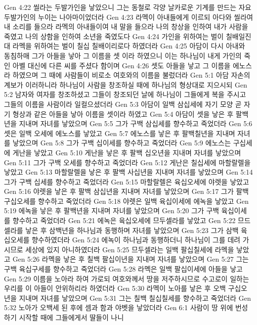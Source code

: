 Gen 4:22  씰라는 두발가인을 낳았으니 그는 동철로 각양 날카로운 기계를 만드는 자요 두발가인의 누이는 나아마이었더라
Gen 4:23  라멕이 아내들에게 이르되 아다와 씰라여 내 소리를 들으라 라멕의 아내들이여 내 말을 들으라 나의 창상을 인하여 내가 사람을 죽였고 나의 상함을 인하여 소년을 죽였도다
Gen 4:24  가인을 위하여는 벌이 칠배일진대 라멕을 위하여는 벌이 칠십 칠배이리로다 하였더라
Gen 4:25  아담이 다시 아내와 동침하매 그가 아들을 낳아 그 이름을 셋 이라 하였으니 이는 하나님이 내게 가인의 죽인 아벨 대신에 다른 씨를 주셨다 함이며
Gen 4:26  셋도 아들을 낳고 그 이름을 에노스라 하였으며 그 때에 사람들이 비로소 여호와의 이름을 불렀더라
Gen 5:1  아담 자손의 계보가 이러하니라 하나님이 사람을 창조하실 때에 하나님의 형상대로 지으시되
Gen 5:2  남자와 여자를 창조하셨고 그들이 창조되던 날에 하나님이 그들에게 복을 주시고 그들의 이름을 사람이라 일컬으셨더라
Gen 5:3  아담이 일백 삼십세에 자기 모양 곧 자기 형상과 같은 아들을 낳아 이름을 셋이라 하였고
Gen 5:4  아담이 셋을 낳은 후 팔백년을 지내며 자녀를 낳았으며
Gen 5:5  그가 구백 삼십세를 향수하고 죽었더라
Gen 5:6  셋은 일백 오세에 에노스를 낳았고
Gen 5:7  에노스를 낳은 후 팔백칠년을 지내며 자녀를 낳았으며
Gen 5:8  그가 구백 십이세를 향수하고 죽었더라
Gen 5:9  에노스는 구십세에 게난을 낳았고
Gen 5:10  게난을 낳은 후 팔백 십오년을 지내며 자녀를 낳았으며
Gen 5:11  그가 구백 오세를 향수하고 죽었더라
Gen 5:12  게난은 칠십세에 마할랄렐을 낳았고
Gen 5:13  마할랄렐을 낳은 후 팔백 사십년을 지내며 자녀를 낳았으며
Gen 5:14  그가 구백 십세를 향수하고 죽었더라
Gen 5:15  마할랄렐은 육십오세에 야렛을 낳았고
Gen 5:16  야렛을 낳은 후 팔백 삼십년을 지내며 자녀를 낳았으며
Gen 5:17  그가 팔백 구십오세를 향수하고 죽었더라
Gen 5:18  야렛은 일백 육십이세에 에녹을 낳았고
Gen 5:19  에녹을 낳은 후 팔백년을 지내며 자녀를 낳았으며
Gen 5:20  그가 구백 육십이세를 향수하고 죽었더라
Gen 5:21  에녹은 육십오세에 므두셀라를 낳았고
Gen 5:22  므드셀라를 낳은 후 삼백년을 하나님과 동행하며 자녀를 낳았으며
Gen 5:23  그가 삼백 육십오세를 향수하였더라
Gen 5:24  에녹이 하나님과 동행하더니 하나님이 그를 데려 가시므로 세상에 있지 아니하였더라
Gen 5:25  므두셀라는 일백 팔십칠세에 라멕을 낳았고
Gen 5:26  라멕을 낳은 후 칠백 팔십이년을 지내며 자녀를 낳았으며
Gen 5:27  그는 구백 육십구세를 향수하고 죽었더라
Gen 5:28  라멕은 일백 팔십이세에 아들을 낳고
Gen 5:29  이름을 노아라 하여 가로되 여호와께서 땅을 저주하시므로 수고로이 일하는 우리를 이 아들이 안위하리라 하였더라
Gen 5:30  라멕이 노아를 낳은 후 오백 구십오년을 지내며 자녀를 낳았으며
Gen 5:31  그는 칠백 칠십칠세를 향수하고 죽었더라
Gen 5:32  노아가 오백세 된 후에 셈과 함과 야벳을 낳았더라
Gen 6:1  사람이 땅 위에 번성하기 시작할 때에 그들에게서 딸들이 나니
